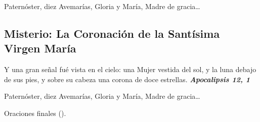 \documentclass[./rosary.tex]{subfiles}
\newcounter{glorious-counter}
\begin{document}
\begin{center}
      Paternóster, diez Avemarías, Gloria y María, Madre de gracia{\ldots}
\end{center}

\bigskip

\subsection*{ Misterio: La Coronación de la Santísima Virgen María}

Y una gran señal fué vista en el cielo: una Mujer vestida del sol, y la luna debajo de sus pies, y sobre su cabeza una corona de doce estrellas. 
\textbf{\emph{Apocalipsis 12, 1}}

\begin{center}
      Paternóster, diez Avemarías, Gloria y María, Madre de gracia{\ldots}

      Oraciones finales ().
\end{center}
\end{document}
